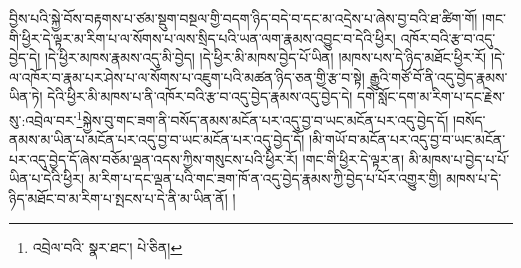 བྱིས་པའི་སྐྱེ་བོས་བརྟགས་པ་ཙམ་སྡུག་བསྔལ་གྱི་བདག་ཉིད་བདེ་བ་དང་མ་འདྲེས་པ་ཞེས་བྱ་བའི་ཐ་ཚིག་གོ། །གང་གི་ཕྱིར་དེ་ལྟར་མ་རིག་པ་ལ་སོགས་པ་ལས་སྲིད་པའི་ཡན་ལག་རྣམས་འབྱུང་བ་དེའི་ཕྱིར། འཁོར་བའི་རྩ་བ་འདུ་བྱེད་དེ། །དེ་ཕྱིར་མཁས་རྣམས་འདུ་མི་བྱེད། །དེ་ཕྱིར་མི་མཁས་བྱེད་པོ་ཡིན། །མཁས་པས་དེ་ཉིད་མཐོང་ཕྱིར་རོ། །དེ་ལ་འཁོར་བ་རྣམ་པར་ཤེས་པ་ལ་སོགས་པ་འཇུག་པའི་མཚན་ཉིད་ཅན་གྱི་རྩ་བ་སྟེ། རྒྱུའི་གཙོ་བོ་ནི་འདུ་བྱེད་རྣམས་ཡིན་ཏེ། དེའི་ཕྱིར་མི་མཁས་པ་ནི་འཁོར་བའི་རྩ་བ་འདུ་བྱེད་རྣམས་འདུ་བྱེད་དེ། དགེ་སློང་དག་མ་རིག་པ་དང་རྗེས་སུ་:འབྲེལ་བར་\footnote{འབྲེལ་བའི་  སྣར་ཐང་།  པེ་ཅིན། }སྐྱེས་བུ་གང་ཟག་ནི་བསོད་ནམས་མངོན་པར་འདུ་བྱ་བ་ཡང་མངོན་པར་འདུ་བྱེད་དོ། །བསོད་ནམས་མ་ཡིན་པ་མངོན་པར་འདུ་བྱ་བ་ཡང་མངོན་པར་འདུ་བྱེད་དོ། །མི་གཡོ་བ་མངོན་པར་འདུ་བྱ་བ་ཡང་མངོན་པར་འདུ་བྱེད་དོ་ཞེས་བཅོམ་ལྡན་འདས་ཀྱིས་གསུངས་པའི་ཕྱིར་རོ། །གང་གི་ཕྱིར་དེ་ལྟར་ན། མི་མཁས་པ་བྱེད་པ་པོ་ཡིན་པ་དེའི་ཕྱིར། མ་རིག་པ་དང་ལྡན་པའི་གང་ཟག་ཁོ་ན་འདུ་བྱེད་རྣམས་ཀྱི་བྱེད་པ་པོར་འགྱུར་གྱི། མཁས་པ་དེ་ཉིད་མཐོང་བ་མ་རིག་པ་སྤངས་པ་དེ་ནི་མ་ཡིན་ནོ། །
